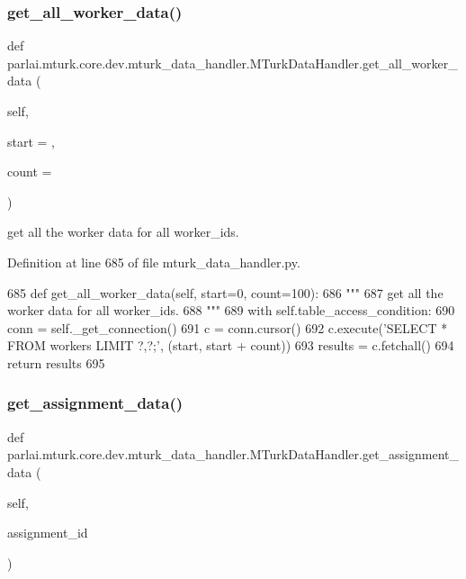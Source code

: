 \subsubsection{\texorpdfstring{get\+\_\+all\+\_\+worker\+\_\+data()}{get\_all\_worker\_data()}}
{\footnotesize\ttfamily def parlai.\+mturk.\+core.\+dev.\+mturk\+\_\+data\+\_\+handler.\+M\+Turk\+Data\+Handler.\+get\+\_\+all\+\_\+worker\+\_\+data (\begin{DoxyParamCaption}\item[{}]{self,  }\item[{}]{start = {},  }\item[{}]{count = {} }\end{DoxyParamCaption})}

\begin{DoxyVerb}get all the worker data for all worker_ids.
\end{DoxyVerb}
 

Definition at line 685 of file mturk\+\_\+data\+\_\+handler.\+py.


\begin{DoxyCode}
685     \textcolor{keyword}{def }get\_all\_worker\_data(self, start=0, count=100):
686         \textcolor{stringliteral}{"""}
687 \textcolor{stringliteral}{        get all the worker data for all worker\_ids.}
688 \textcolor{stringliteral}{        """}
689         with self.table\_access\_condition:
690             conn = self.\_get\_connection()
691             c = conn.cursor()
692             c.execute(\textcolor{stringliteral}{'SELECT * FROM workers LIMIT ?,?;'}, (start, start + count))
693             results = c.fetchall()
694             \textcolor{keywordflow}{return} results
695 
\end{DoxyCode}
\mbox{\label{classparlai_1_1mturk_1_1core_1_1dev_1_1mturk__data__handler_1_1MTurkDataHandler_a70ee72567e0c94eea130cdee21549ada}} 
\subsubsection{\texorpdfstring{get\+\_\+assignment\+\_\+data()}{get\_assignment\_data()}}
{\footnotesize\ttfamily def parlai.\+mturk.\+core.\+dev.\+mturk\+\_\+data\+\_\+handler.\+M\+Turk\+Data\+Handler.\+get\+\_\+assignment\+\_\+data (\begin{DoxyParamCaption}\item[{}]{self,  }\item[{}]{assignment\+\_\+id }\end{DoxyParamCaption})}

